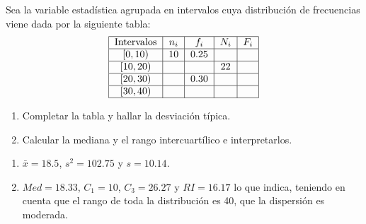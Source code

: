 {Sea la variable estadística agrupada en intervalos cuya distribución de frecuencias viene dada por la siguiente tabla:
\[
\begin{tabular}{|c|c|c|c|c|}
\hline
Intervalos & $n_{i}$ & $f_{i}$ & $N_{i}$ & $F_{i}$ \\ \hline
$\left[ 0,10\right) $ & 10 & 0.25 &  &  \\ \hline
$\left[ 10,20\right) $ &  &  & 22 &  \\ \hline
$\left[ 20,30\right) $ &  & 0.30 &  &  \\ \hline
$\left[ 30,40\right) $ &  &  &  &  \\ \hline
\end{tabular}
\]
\begin{enumerate}
\item  Completar la tabla y hallar la desviación típica.
\item  Calcular la mediana y el rango intercuartílico e interpretarlos.
\end{enumerate}
}
{\begin{enumerate}
\item $\bar{x}= 18.5$, $s^2=102.75$ y $s=10.14$. 
\item $Med = 18.33$, $C_1=10$, $C_3 = 26.27$ y $RI= 16.17$ lo que indica, teniendo en cuenta que el rango de toda la distribución es 40, que la dispersión es moderada.
\end{enumerate}
}
{}


